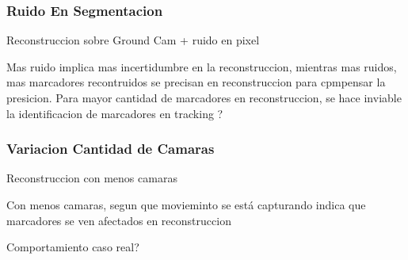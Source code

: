 \subsubsection{Ruido En Segmentacion}

Reconstruccion sobre Ground Cam + ruido en pixel

Mas ruido implica mas incertidumbre en la reconstruccion, mientras mas ruidos, mas marcadores recontruidos se precisan en reconstruccion para cpmpensar la presicion. Para mayor cantidad de marcadores en reconstruccion, se hace inviable la identificacion de marcadores en tracking ?

\subsubsection{Variacion Cantidad de Camaras}

Reconstruccion con menos camaras

Con menos camaras, segun que movieminto se está capturando indica que marcadores se ven afectados en reconstruccion


Comportamiento caso real?


